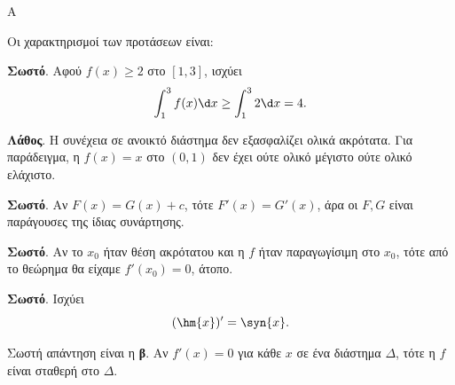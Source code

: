 \begin{thema}{Α}
\begin{erwthma}
\item {}

\item {}

\item {}

\item Οι χαρακτηρισμοί των προτάσεων είναι:
\begin{alist}
\item \textbf{Σωστό}. Αφού $f(x)\ge2$ στο $[1,3]$, ισχύει
\[ \dint_1^3 f(x)\d x\ge\dint_1^3 2\d x=4. \]
\item \textbf{Λάθος}. Η συνέχεια σε ανοικτό διάστημα δεν εξασφαλίζει ολικά ακρότατα. Για παράδειγμα, η $f(x)=x$ στο $(0,1)$ δεν έχει ούτε ολικό μέγιστο ούτε ολικό ελάχιστο.
\item \textbf{Σωστό}. Αν $F(x)=G(x)+c$, τότε $F'(x)=G'(x)$, άρα οι $F,G$ είναι παράγουσες της ίδιας συνάρτησης.
\item \textbf{Σωστό}. Αν το $x_0$ ήταν θέση ακρότατου και η $f$ ήταν παραγωγίσιμη στο $x_0$, τότε από το θεώρημα  θα είχαμε $f'(x_0)=0$, άτοπο.
\item \textbf{Σωστό}. Ισχύει
\[ (\hm{x})'=\syn{x}. \]
\end{alist}

\item Σωστή απάντηση είναι η \textbf{β}. Αν $f'(x)=0$ για κάθε $x$ σε ένα διάστημα $\Delta$, τότε η $f$ είναι σταθερή στο $\Delta$.
\end{erwthma}
\end{thema}


